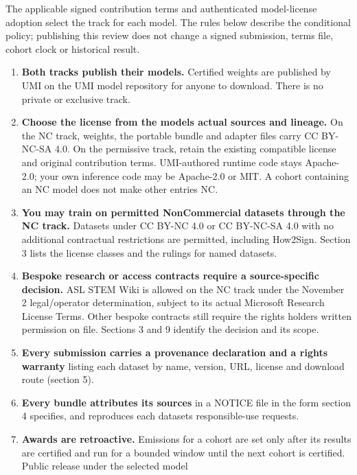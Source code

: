 \documentclass[10pt,a4paper]{article}
\providecommand{\tightlist}{\setlength{\itemsep}{0pt}\setlength{\parskip}{0pt}}
\begin{document}
The applicable signed contribution terms and authenticated model-license
adoption select the track for each model. The rules below describe the
conditional policy; publishing this review does not change a signed
submission, terms file, cohort clock or historical result.

\begin{enumerate}
\def\labelenumi{\arabic{enumi}.}
\tightlist
\item
  \textbf{Both tracks publish their models.} Certified weights are
  published by UMI on the UMI model repository for anyone to download.
  There is no private or exclusive track.
\item
  \textbf{Choose the license from the model\textquotesingle s actual
  sources and lineage.} On the NC track, weights, the portable bundle
  and adapter files carry CC BY-NC-SA 4.0. On the permissive track,
  retain the existing compatible license and original contribution
  terms. UMI-authored runtime code stays Apache-2.0; your own inference
  code may be Apache-2.0 or MIT. A cohort containing an NC model does
  not make other entries NC.
\item
  \textbf{You may train on permitted NonCommercial datasets through the
  NC track.} Datasets under CC BY-NC 4.0 or CC BY-NC-SA 4.0 with no
  additional contractual restrictions are permitted, including How2Sign.
  Section 3 lists the license classes and the rulings for named
  datasets.
\item
  \textbf{Bespoke research or access contracts require a source-specific
  decision.} ASL STEM Wiki is allowed on the NC track under the
  November 2 legal/operator determination, subject to its actual
  Microsoft Research License Terms. Other bespoke contracts still
  require the rights holder\textquotesingle s written permission on
  file. Sections 3 and 9 identify the decision and its scope.
\item
  \textbf{Every submission carries a provenance declaration and a rights
  warranty} listing each dataset by name, version, URL, license and
  download route (section 5).
\item
  \textbf{Every bundle attributes its sources} in a NOTICE file in the
  form section 4 specifies, and reproduces each
  dataset\textquotesingle s responsible-use requests.
\item
  \textbf{Awards are retroactive.} Emissions for a cohort are set only
  after its results are certified and run for a bounded window until the
  next cohort is certified. Public release under the selected model

\end{enumerate}
\end{document}
